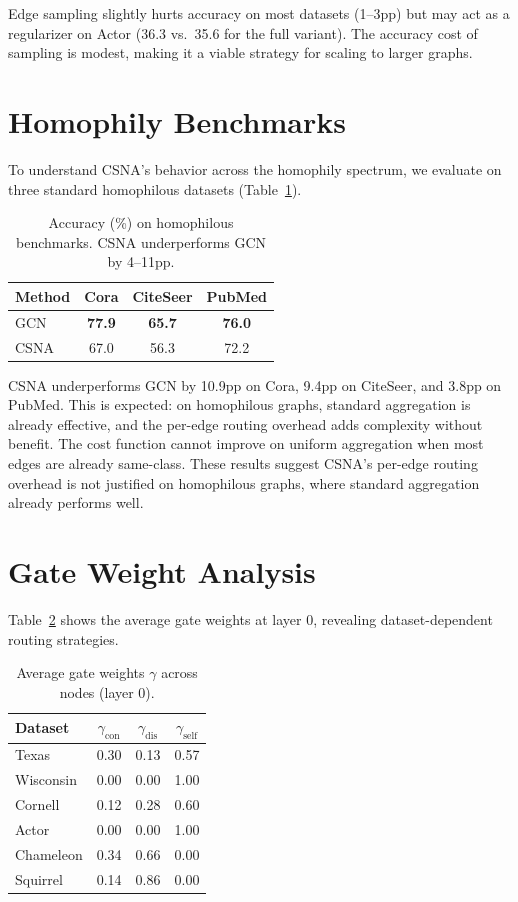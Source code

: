 \documentclass[runningheads]{llncs}
\begin{document}
Edge sampling slightly hurts accuracy on most datasets (1--3pp) but may act as a regularizer on Actor (36.3 vs.\ 35.6 for the full variant).
The accuracy cost of sampling is modest, making it a viable strategy for scaling to larger graphs.


\section{Homophily Benchmarks}\label{app:homophily}

To understand CSNA's behavior across the homophily spectrum, we evaluate on three standard homophilous datasets (Table~\ref{tab:homophily}).

\begin{table}[h]
\caption{Accuracy (\%) on homophilous benchmarks. CSNA underperforms GCN by 4--11pp.}\label{tab:homophily}
\centering
\begin{tabular}{lccc}
\toprule
Method & Cora & CiteSeer & PubMed \\
\midrule
GCN & \textbf{77.9} & \textbf{65.7} & \textbf{76.0} \\
CSNA & 67.0 & 56.3 & 72.2 \\
\bottomrule
\end{tabular}
\end{table}

CSNA underperforms GCN by 10.9pp on Cora, 9.4pp on CiteSeer, and 3.8pp on PubMed.
This is expected: on homophilous graphs, standard aggregation is already effective, and the per-edge routing overhead adds complexity without benefit.
The cost function cannot improve on uniform aggregation when most edges are already same-class.
These results suggest CSNA's per-edge routing overhead is not justified on homophilous graphs, where standard aggregation already performs well.


\section{Gate Weight Analysis}\label{app:gate}

Table~\ref{tab:gate_weights} shows the average gate weights at layer 0, revealing dataset-dependent routing strategies.

\begin{table}[h]
\caption{Average gate weights $\gamma$ across nodes (layer 0).}\label{tab:gate_weights}
\centering
\small
\begin{tabular}{lccc}
\toprule
Dataset & $\gamma_{\text{con}}$ & $\gamma_{\text{dis}}$ & $\gamma_{\text{self}}$ \\
\midrule
Texas & 0.30 & 0.13 & 0.57 \\
Wisconsin & 0.00 & 0.00 & 1.00 \\
Cornell & 0.12 & 0.28 & 0.60 \\
Actor & 0.00 & 0.00 & 1.00 \\
Chameleon & 0.34 & 0.66 & 0.00 \\
Squirrel & 0.14 & 0.86 & 0.00 \\
\bottomrule
\end{tabular}
\end{table}
\end{document}
